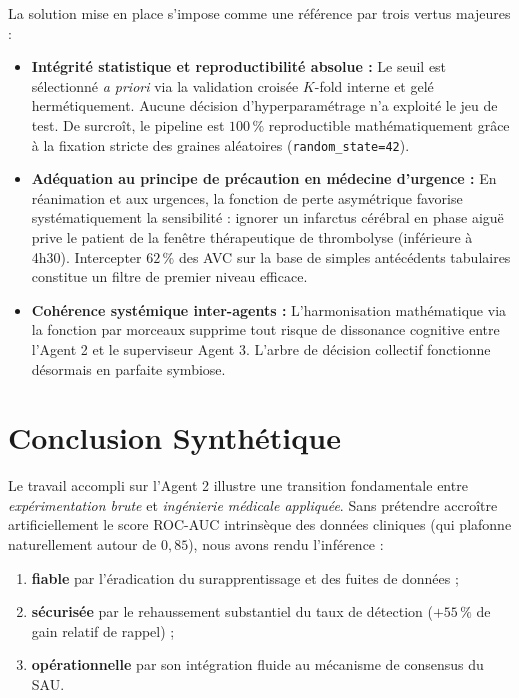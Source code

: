 \documentclass[11pt,a4paper]{article}
\begin{document}
La solution mise en place s'impose comme une référence par trois vertus majeures :

\begin{itemize}[leftmargin=*, label=\color{medcyan}]
    \item \textbf{Intégrité statistique et reproductibilité absolue :}
    Le seuil est sélectionné \emph{a priori} via la validation croisée $K$-fold interne et gelé hermétiquement. Aucune décision d'hyperparamétrage n'a exploité le jeu de test. De surcroît, le pipeline est $100\,\%$ reproductible mathématiquement grâce à la fixation stricte des graines aléatoires (\texttt{random\_state=42}).
    
    \item \textbf{Adéquation au principe de précaution en médecine d'urgence :}
    En réanimation et aux urgences, la fonction de perte asymétrique favorise systématiquement la sensibilité : ignorer un infarctus cérébral en phase aiguë prive le patient de la fenêtre thérapeutique de thrombolyse (inférieure à 4h30). Intercepter $62\,\%$ des AVC sur la base de simples antécédents tabulaires constitue un filtre de premier niveau efficace.
    
    \item \textbf{Cohérence systémique inter-agents :}
    L'harmonisation mathématique via la fonction par morceaux supprime tout risque de dissonance cognitive entre l'Agent 2 et le superviseur Agent 3. L'arbre de décision collectif fonctionne désormais en parfaite symbiose.
\end{itemize}

\section{Conclusion Synthétique}

Le travail accompli sur l'Agent 2 illustre une transition fondamentale entre \emph{expérimentation brute} et \emph{ingénierie médicale appliquée}. Sans prétendre accroître artificiellement le score ROC-AUC intrinsèque des données cliniques (qui plafonne naturellement autour de $0{,}85$), nous avons rendu l'inférence :
\begin{enumerate}[label=\alph*)]
    \item \textbf{fiable} par l'éradication du surapprentissage et des fuites de données ;
    \item \textbf{sécurisée} par le rehaussement substantiel du taux de détection ($+55\,\%$ de gain relatif de rappel) ;
    \item \textbf{opérationnelle} par son intégration fluide au mécanisme de consensus du SAU.
\end{enumerate}
\end{document}
